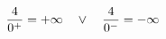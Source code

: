 \documentclass[preview]{standalone}
\begin{document}
\begin{align*}
\special{dvisvgm:raw <g id='unique000'>}\frac{4}{0^+} = +\infty \quad \lor \quad \frac{4}{0^-} = -\infty\special{dvisvgm:raw </g>}
\end{align*}
\end{document}
